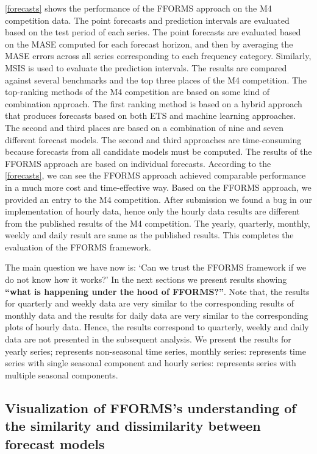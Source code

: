 \documentclass[11pt,a4paper,]{article}
\begin{document}
\autoref{forecasts} shows the performance of the FFORMS approach on the M4 competition data. The point forecasts and prediction intervals are evaluated based on the test period of each series. The point forecasts are evaluated based on the MASE computed for each forecast horizon, and then by averaging the MASE errors across all series corresponding to each frequency category. Similarly, MSIS is used to evaluate the prediction intervals. The results are compared against several benchmarks and the top three places of the M4 competition. The top-ranking methods of the M4 competition are based on some kind of combination approach. The first ranking method is based on a hybrid approach that produces forecasts based on both ETS and machine learning approaches. The second and third places are based on a combination of nine and seven different forecast models. The second and third approaches are time-consuming because forecasts from all candidate models must be computed. The results of the FFORMS approach are based on individual forecasts. According to the \autoref{forecasts}, we can see the FFORMS approach achieved comparable performance in a much more cost and time-effective way. Based on the FFORMS approach, we provided an entry to the M4 competition. After submission we found a bug in our implementation of hourly data, hence only the hourly data results are different from the published results of the M4 competition. The yearly, quarterly, monthly, weekly and daily result are same as the published results. This completes the evaluation of the FFORMS framework.

The main question we have now is: `Can we trust the FFORMS framework if we do not know how it works?' In the next sections we present results showing \textbf{``what is happening under the hood of FFORMS?''}. Note that, the results for quarterly and weekly data are very similar to the corresponding results of monthly data and the results for daily data are very similar to the corresponding plots of hourly data. Hence, the results correspond to quarterly, weekly and daily data are not presented in the subsequent analysis. We present the results for yearly series; represents non-seasonal time series, monthly series: represents time series with single seasonal component and hourly series: represents series with multiple seasonal components.

\hypertarget{oobviz}{%
\subsection{Visualization of FFORMS's understanding of the similarity and dissimilarity between forecast models}\label{oobviz}}
\end{document}
